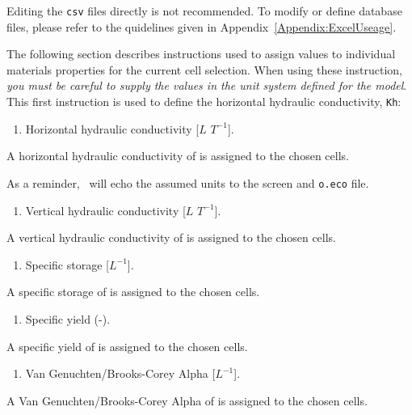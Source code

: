 {Editing the \texttt{csv} files directly is not recommended. To modify or define database files, please refer to the quidelines given in Appendix~\ref{Appendix:ExcelUseage}.

The following section describes instructions used to assign values to individual materials properties for the current cell selection.  When using these instruction, {\em you must be careful to supply the values in the unit system defined for the model}. This first instruction is used to define the horizontal hydraulic conductivity, \texttt{Kh}:

    {
        \squish
        \begin{enumerate}
        \item {}  Horizontal hydraulic conductivity [$L$   $T^{-1}$].
        \end{enumerate}
          A horizontal hydraulic conductivity of  is assigned to the chosen cells.
    }

As a reminder, \mut\ will echo the assumed units to the screen and \texttt{o.eco} file.

    {
        \squish
        \begin{enumerate}
        \item {}  Vertical hydraulic conductivity [$L$   $T^{-1}$].
        \end{enumerate}
          A vertical hydraulic conductivity of  is assigned to the chosen cells.
    }

    {
        \squish
        \begin{enumerate}
        \item {}  Specific storage [$L^{-1}$].
        \end{enumerate}
          A specific storage of  is assigned to the chosen cells.
    }

    {
        \squish
        \begin{enumerate}
        \item {}  Specific yield (-).
        \end{enumerate}
          A specific yield of   is assigned to the chosen cells.
    }

    {
        \squish
        \begin{enumerate}
        \item {}  Van Genuchten/Brooks-Corey Alpha [$L^{-1}$].
        \end{enumerate}
          A Van Genuchten/Brooks-Corey Alpha of  is assigned to the chosen cells.
    }

}
